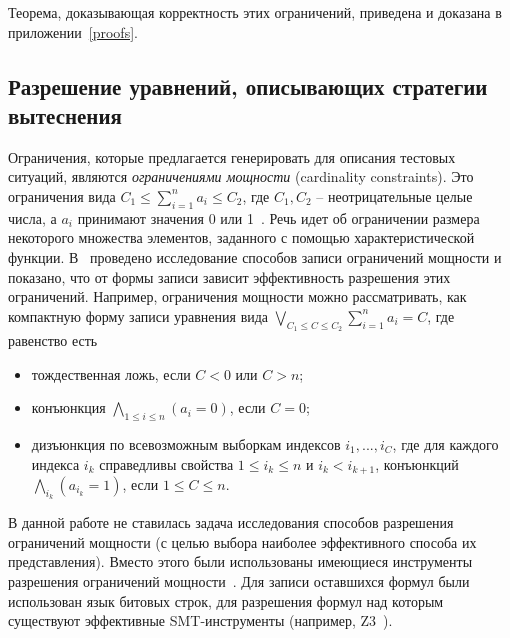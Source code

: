 \documentclass[14pt]{extreport}
\begin{document}

Теорема, доказывающая корректность этих ограничений, приведена и доказана в
приложении~\ref{proofs}.


\subsection{Разрешение уравнений, описывающих стратегии вытеснения}

Ограничения, которые предлагается генерировать для описания тестовых ситуаций,
являются \emph{ограничениями мощности} (cardinality constraints). Это
ограничения вида $C_1 \leqslant \sum_{i=1}^n a_i \leqslant C_2$, где $C_1, C_2$
-- неотрицательные целые числа, а $a_i$ принимают значения 0 или
1~\cite{smt_debugging, PiskacK08, KuncakR07,
Revesz05}. Речь идет об ограничении размера некоторого множества
элементов, заданного с помощью характеристической функции.
В~\cite{smt_debugging} проведено исследование способов записи
ограничений мощности и показано, что от формы записи зависит
эффективность разрешения этих ограничений. Например, ограничения
мощности можно рассматривать, как компактную форму записи уравнения
вида $\bigvee_{C_1 \leqslant C \leqslant C_2} \sum_{i=1}^n a_i = C$,
где равенство есть
\begin{itemize}
\item тождественная ложь, если $C < 0$ или $C > n$;
\item конъюнкция $\bigwedge_{1\leqslant i\leqslant n} (a_i = 0)$,
если $C = 0$;
\item дизъюнкция по всевозможным выборкам индексов $i_1, ..., i_C$, где
для каждого индекса $i_k$ справедливы свойства $1 \leqslant i_k
\leqslant n$ и $i_k < i_{k+1}$, конъюнкций $\bigwedge_{i_k} (a_{i_k}
= 1)$, если $1 \leqslant C \leqslant n$.
\end{itemize}

В данной работе не ставилась задача исследования способов разрешения ограничений
мощности (с целью выбора наиболее эффективного способа их представления). Вместо
этого были использованы
имеющиеся инструменты разрешения ограничений мощности~\cite{Z3, Yices}. Для
записи оставшихся формул были использован язык битовых строк, для разрешения
формул над которым существуют эффективные SMT-инструменты (например,
Z3~\cite{Z3}).
\end{document}
